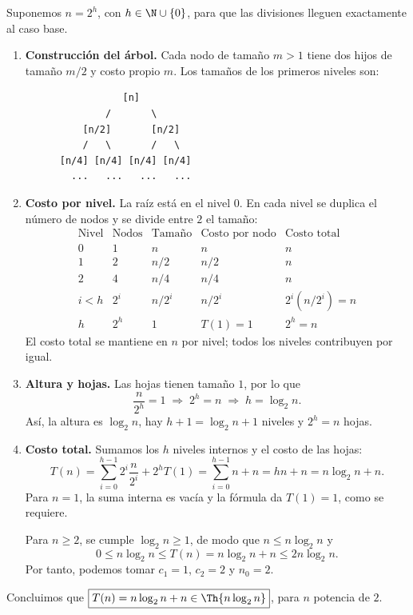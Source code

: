 
Suponemos $n=2^h$, con $h\in\N\cup\{0\}$, para que las divisiones lleguen exactamente al caso base.

\begin{enumerate}
\item \textbf{Construcción del árbol.} Cada nodo de tamaño $m>1$ tiene dos hijos de tamaño $m/2$ y costo propio $m$. Los tamaños de los primeros niveles son:
\begin{verbatim}
                 [n]
              /       \
          [n/2]       [n/2]
          /   \       /   \
      [n/4] [n/4] [n/4] [n/4]
        ...   ...   ...   ...
\end{verbatim}

\item \textbf{Costo por nivel.} La raíz está en el nivel $0$. En cada nivel se duplica el número de nodos y se divide entre $2$ el tamaño:
\[
\begin{array}{c|c|c|c|c}
\text{Nivel}&\text{Nodos}&\text{Tamaño}&\text{Costo por nodo}&\text{Costo total}\\ \hline
0&1&n&n&n\\
1&2&n/2&n/2&n\\
2&4&n/4&n/4&n\\
i<h&2^i&n/2^i&n/2^i&2^i(n/2^i)=n\\
h&2^h&1&T(1)=1&2^h=n
\end{array}
\]
El costo total se mantiene en $n$ por nivel; todos los niveles contribuyen por igual.

\item \textbf{Altura y hojas.} Las hojas tienen tamaño $1$, por lo que
\[
\frac{n}{2^h}=1\;\Rightarrow\;2^h=n\;\Rightarrow\;h=\log_2 n.
\]
Así, la altura es $\log_2 n$, hay $h+1=\log_2 n+1$ niveles y $2^h=n$ hojas.

\item \textbf{Costo total.} Sumamos los $h$ niveles internos y el costo de las hojas:
\[
T(n)=\sum_{i=0}^{h-1}2^i\frac{n}{2^i}+2^hT(1)
=\sum_{i=0}^{h-1}n+n
=hn+n
=n\log_2 n+n.
\]
Para $n=1$, la suma interna es vacía y la fórmula da $T(1)=1$, como se requiere.

Para $n\ge2$, se cumple $\log_2 n\ge1$, de modo que $n\le n\log_2 n$ y
\[
0\le n\log_2 n\le T(n)=n\log_2 n+n\le2n\log_2 n.
\]
Por tanto, podemos tomar $c_1=1$, $c_2=2$ y $n_0=2$.
\end{enumerate}

Concluimos que $\boxed{T(n)=n\log_2 n+n\in\Th{n\log_2 n}}$, para $n$ potencia de $2$.
\fin
